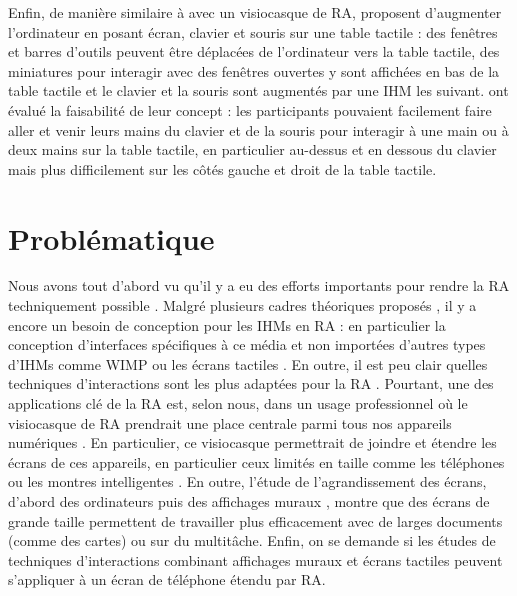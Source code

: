 
Enfin, de manière similaire à \cite{Serrano2015} avec un visiocasque de RA, \cite{Bi2011} proposent d'augmenter l'ordinateur en posant écran, clavier et souris sur une table tactile  : des fenêtres et barres d'outils peuvent être déplacées de l'ordinateur vers la table tactile, des miniatures pour interagir avec des fenêtres ouvertes y sont affichées en bas de la table tactile et le clavier et la souris sont augmentés par une IHM les suivant. \citeauthor{Bi2011} ont évalué la faisabilité de leur concept : les participants pouvaient facilement faire aller et venir leurs mains du clavier et de la souris pour interagir à une main ou à deux mains sur la table tactile, en particulier au-dessus et en dessous du clavier mais plus difficilement sur les côtés gauche et droit de la table tactile.


\section{Problématique}
\label{sec:research_problem}

Nous avons tout d'abord vu qu'il y a eu des efforts importants pour rendre la RA techniquement possible \citep{Azuma2001, VanKrevelen2010}. Malgré plusieurs cadres théoriques proposés \citep{Milgram1994, Rekimoto1995, Bimber2005, Ens2014a}, il y a encore un besoin de conception pour les IHMs en RA \citep{Billinghurst2015} : en particulier la conception d'interfaces spécifiques à ce média et non importées d'autres types d'IHMs comme WIMP ou les écrans tactiles \citep{VanDam1997, Billinghurst2005}. En outre, il est peu clair quelles techniques d'interactions sont les plus adaptées pour la RA \citep{Argelaguet2013, Piumsomboon2013, Piumsomboon2014}. Pourtant, une des applications clé de la RA est, selon nous, dans un usage professionnel où le visiocasque de RA prendrait une place centrale parmi tous nos appareils numériques \citep{Rekimoto1995, Serrano2015}. En particulier, ce visiocasque permettrait de joindre et étendre les écrans de ces appareils, en particulier ceux limités en taille comme les téléphones ou les montres intelligentes \cite{Grubert2015}. En outre, l'étude de l'agrandissement des écrans, d'abord des ordinateurs \cite{Baudisch2002, Guiard2004} puis des affichages muraux \cite{Liu2014, Raedle2014}, montre que des écrans de grande taille permettent de travailler plus efficacement avec de larges documents (comme des cartes) ou sur du multitâche. Enfin, on se demande si les études de techniques d'interactions combinant affichages muraux et écrans tactiles \cite{Nancel2011, Berge2014} peuvent s'appliquer à un écran de téléphone étendu par RA.

